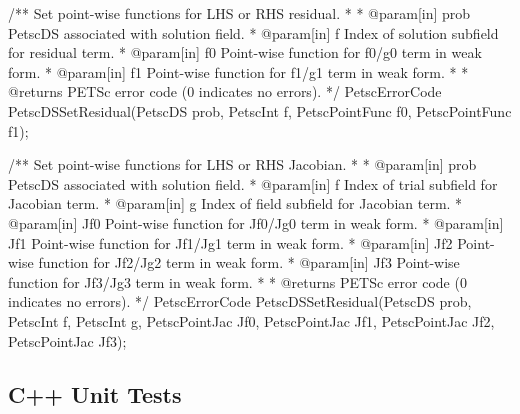 \begin{cplusplus}
/** Set point-wise functions for LHS or RHS residual.
 *
 * @param[in] prob PetscDS associated with solution field.
 * @param[in] f Index of solution subfield for residual term.
 * @param[in] f0 Point-wise function for f0/g0 term in weak form.
 * @param[in] f1 Point-wise function for f1/g1 term in weak form.
 *
 * @returns PETSc error code (0 indicates no errors).
 */
 PetscErrorCode
 PetscDSSetResidual(PetscDS prob,
                    PetscInt f,
                    PetscPointFunc f0,
                    PetscPointFunc f1);
\end{cplusplus}
  
\begin{cplusplus}
/** Set point-wise functions for LHS or RHS Jacobian.
 *
 * @param[in] prob PetscDS associated with solution field.
 * @param[in] f Index of trial subfield for Jacobian term.
 * @param[in] g Index of field subfield for Jacobian term.
 * @param[in] Jf0 Point-wise function for Jf0/Jg0 term in weak form.
 * @param[in] Jf1 Point-wise function for Jf1/Jg1 term in weak form.
 * @param[in] Jf2 Point-wise function for Jf2/Jg2 term in weak form.
 * @param[in] Jf3 Point-wise function for Jf3/Jg3 term in weak form.
 *
 * @returns PETSc error code (0 indicates no errors).
 */
 PetscErrorCode
 PetscDSSetResidual(PetscDS prob,
                    PetscInt f,
                    PetscInt g,
                    PetscPointJac Jf0,
                    PetscPointJac Jf1,
                    PetscPointJac Jf2,
                    PetscPointJac Jf3);
\end{cplusplus}
  

\subsection{C++ Unit Tests}




